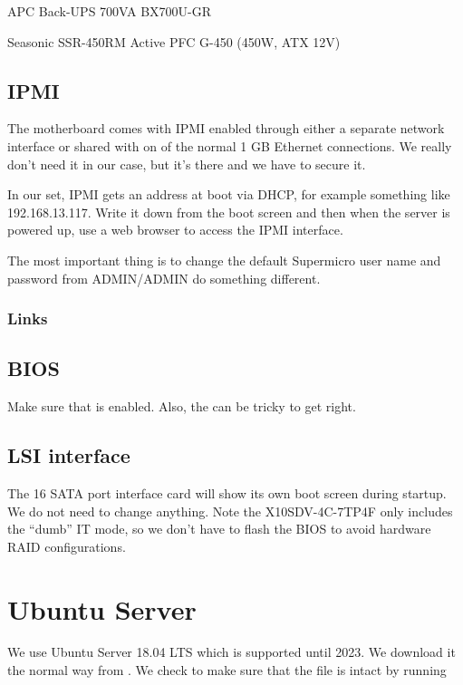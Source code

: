 \documentclass[a4paper,10pt,english]{sphinxmanual}
\begin{document}
 APC Back-UPS 700VA BX700U-GR

 Seasonic SSR-450RM Active PFC G-450 (450W, ATX 12V)


\section{IPMI}
\label{\detokenize{hardware:ipmi}}
The motherboard comes with IPMI enabled through either a separate network
interface or shared with on of the normal 1 GB Ethernet connections. We really
don’t need it in our case, but it’s there and we have to secure it.

In our set, IPMI gets an address at boot via DHCP, for example something like
192.168.13.117. Write it down from the boot screen and then when the server is
powered up, use a web browser to access the IPMI interface.

The most important thing is to change the default Supermicro user name and
password from ADMIN/ADMIN do something different.


\subsection{Links}
\label{\detokenize{hardware:links}}


\section{BIOS}
\label{\detokenize{hardware:bios}}
Make sure that  is enabled. Also, the 
can be tricky to get right.


\section{LSI interface}
\label{\detokenize{hardware:lsi-interface}}
The 16 SATA port interface card will show its own boot screen during startup. We
do not need to change anything. Note the X10SDV-4C-7TP4F only includes the
“dumb” IT mode, so we don’t have to flash the BIOS to avoid hardware RAID
configurations.


\chapter{Ubuntu Server}
\label{\detokenize{os:ubuntu-server}}\label{\detokenize{os::doc}}
We use Ubuntu Server 18.04 LTS which is supported until 2023. We download it the
normal way from  . We check to make sure
that the file is intact by running
\end{document}
